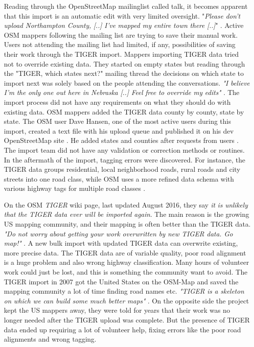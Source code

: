 Reading through the OpenStreetMap mailinglist called talk, it becomes apparent that this import is an automatic edit with very limited oversight. "\textit{Please don't upload Northampton County, [..] I've mapped my entire town there [..]}" \cite{Mielczarek2007}.  Active OSM mappers following the mailing list are trying to save their manual work. Users not attending the mailing list had limited, if any, possibilities of saving their work through the TIGER import. Mappers importing TIGER data tried not to override existing data. They started on empty states but reading through the "TIGER, which states next?" mailing thread the decisions on which state to import next was solely based on the people attending the conversations. \textit{"I believe I'm the only one out here in Nebraska [..] Feel free to override my edits"} \cite{Bishop2007}. The import process did not have any requirements on what they should do with existing data. OSM mappers added the TIGER data county by county, state by state. The OSM user Dave Hansen, one of the most active users during this import, created a text file with his upload queue and published it on his dev OpenStreetMap site \cite{Hansen2007a}. He added states and counties after requests from users \cite{Hansen2007}. The import team did not have any validation or correction methods or routines. In the aftermath of the import, tagging errors were discovered. For instance, the TIGER data groups residential, local neighborhood roads, rural roads and city streets into one road class, while OSM uses a more refined data schema with various highway tags for multiple road classes \cite{Zielstra2013}.

On the OSM \textit{TIGER} wiki page, last updated August 2016, they say \textit{it is unlikely that the TIGER data ever will be imported again}. The main reason is the growing US mapping community, and their mapping is often better than the TIGER data. \textit{"Do not worry about getting your work overwritten by new TIGER data. Go map!"}  \cite{WikiOSMTIGER2007}. A new bulk import with updated TIGER data can overwrite existing, more precise data. The TIGER data are of variable quality, poor road alignment is a huge problem and also wrong highway classification. Many hours of volunteer work could just be lost, and this is something the community want to avoid. The TIGER import in 2007 got the United States on the OSM-Map and saved the mapping community a lot of time finding road names etc. \textit{"TIGER is a skeleton on which we can build some much better maps"} \cite{Willis2007}. On the opposite side the project kept the US mappers away, they were told for years that their work was no longer needed after the TIGER upload was complete. But the presence of TIGER data ended up requiring a lot of volunteer help, fixing errors like the poor road alignments and wrong tagging. 

